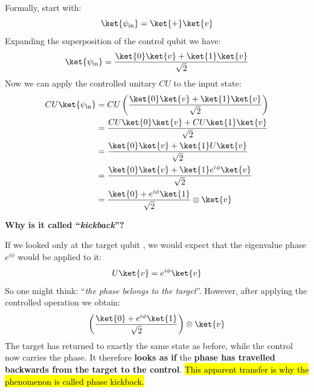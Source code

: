 \begin{definitionbox}
    \highspace
    Formally, start with:
    \begin{equation*}
        \ket{\psi_{\text{in}}} = \ket{+} \ket{v}
    \end{equation*}
    Expanding the superposition of the control qubit \ket{+} we have:
    \begin{equation*}
        \ket{\psi_{\text{in}}} = \frac{\ket{0}\ket{v} + \ket{1}\ket{v}}{\sqrt{2}}
    \end{equation*}
    Now we can apply the controlled unitary $CU$ to the input state:
    \begin{align*}
        CU\ket{\psi_{\text{in}}} &= CU\left(\frac{\ket{0}\ket{v} + \ket{1}\ket{v}}{\sqrt{2}}\right) \\
        &= \frac{CU\ket{0}\ket{v} + CU\ket{1}\ket{v}}{\sqrt{2}} \\
        &= \frac{\ket{0}\ket{v} + \ket{1}U\ket{v}}{\sqrt{2}} \\
        &= \frac{\ket{0}\ket{v} + \ket{1} e^{i\phi}\ket{v}}{\sqrt{2}} \\
        &= \frac{\ket{0} + e^{i\phi}\ket{1}}{\sqrt{2}} \otimes \ket{v}
    \end{align*}
\end{definitionbox}

\highspace
\begin{flushleft}
    \textcolor{Green3}{ \textbf{Why is it called ``\emph{kickback}''?}}
\end{flushleft}
If we looked only at the target qubit , we would expect that the eigenvalue phase $e^{i\phi}$ would be applied to it:
\begin{equation*}
    U\ket{v} = e^{i\phi}\ket{v}
\end{equation*}
So one might think: ``\emph{the phase belongs to the target}''. However, after applying the controlled operation we obtain:
\begin{equation*}
    \left(\frac{\ket{0} + e^{i\phi}\ket{1}}{\sqrt{2}}\right) \otimes \ket{v}
\end{equation*}
The target has returned to exactly the same state  as before, while the control now carries the phase. It therefore \textbf{looks as if} the \textbf{phase has travelled backwards from the target to the control}. \hl{This apparent transfer is why the phenomenon is called phase kickback.}

